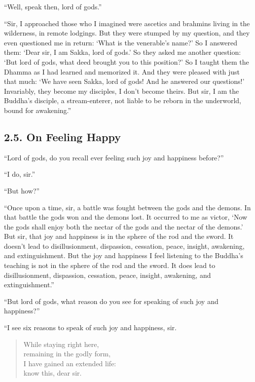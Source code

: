\documentclass[12pt,openany]{book}%
\begin{document}
“Well, speak then, lord of gods.” 

“Sir, I approached those who I imagined were ascetics and brahmins living in the wilderness, in remote lodgings. But they were stumped by my question, and they even questioned me in return: ‘What is the venerable’s name?’ So I answered them: ‘Dear sir, I am Sakka, lord of gods.’ So they asked me another question: ‘But lord of gods, what deed brought you to this position?’ So I taught them the Dhamma as I had learned and memorized it. And they were pleased with just that much: ‘We have seen Sakka, lord of gods! And he answered our questions!’ Invariably, they become my disciples, I don’t become theirs. But sir, I am the Buddha’s disciple, a stream-enterer, not liable to be reborn in the underworld, bound for awakening.” 

\subsection*{2.5. On Feeling Happy }

“Lord of gods, do you recall ever feeling such joy and happiness before?” 

“I do, sir.” 

“But how?” 

“Once upon a time, sir, a battle was fought between the gods and the demons. In that battle the gods won and the demons lost. It occurred to me as victor, ‘Now the gods shall enjoy both the nectar of the gods and the nectar of the demons.’ But sir, that joy and happiness is in the sphere of the rod and the sword. It doesn’t lead to disillusionment, dispassion, cessation, peace, insight, awakening, and extinguishment. But the joy and happiness I feel listening to the Buddha’s teaching is not in the sphere of the rod and the sword. It does lead to disillusionment, dispassion, cessation, peace, insight, awakening, and extinguishment.” 

“But lord of gods, what reason do you see for speaking of such joy and happiness?” 

“I see six reasons to speak of such joy and happiness, sir. 

\begin{verse}%
While staying right here, \\
remaining in the godly form, \\
I have gained an extended life: \\
know this, dear sir. 

%
\end{verse}
\end{document}
